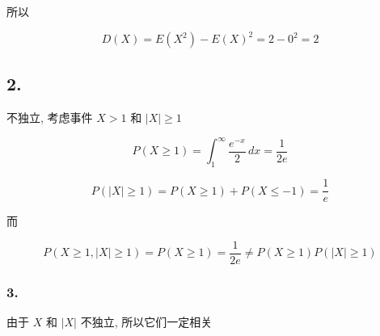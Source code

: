 \documentclass[]{article}
\begin{document}
所以

\[D(X)=E(X^2)-E(X)^2=2-0^2=2\]

\subsection{2.}\label{header-n46}

不独立, 考虑事件 \(X>1\) 和 \(|X|\ge1\)

\[P(X\ge1)=\int_1^{\infty } \frac{ e^{-x}}{2} \, dx=\frac{1}{2e}\]

\[P(|X|\ge1)=P(X \ge 1)+P(X \le -1)=\frac{1}{e}\]

而

\[P(X\ge 1,|X|\ge1)=P(X\ge1)=\frac{1}{2e}\neq P(X\ge 1)P(|X|\ge1)\]

\subsubsection{3.}\label{header-n66}

由于 \(X\) 和 \(|X|\) 不独立, 所以它们一定相关
\end{document}
